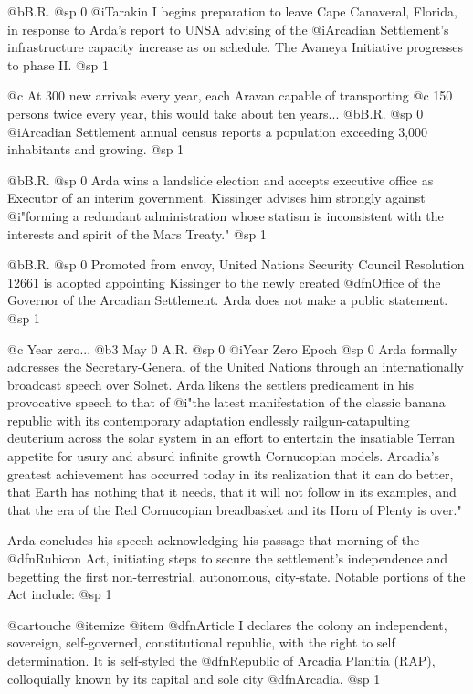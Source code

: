 @b{B.R.}
@sp 0
@i{Tarakin I} begins preparation to leave Cape Canaveral, Florida, in response to Arda's report to UNSA advising of the @i{Arcadian Settlement's} infrastructure capacity increase as on schedule. The Avaneya Initiative progresses to phase II.
@sp 1

@c At 300 new arrivals every year, each Aravan capable of transporting
@c  150 persons twice every year, this would take about ten years...
@b{B.R.}
@sp 0
@i{Arcadian Settlement} annual census reports a population exceeding 3,000 inhabitants and growing.
@sp 1

@b{B.R.}
@sp 0
Arda wins a landslide election and accepts executive office as Executor of an interim government. Kissinger advises him strongly against @i{"forming a redundant administration whose statism is inconsistent with the interests and spirit of the Mars Treaty."}
@sp 1

@b{B.R.}
@sp 0
Promoted from envoy, United Nations Security Council Resolution 12661 is adopted appointing Kissinger to the newly created @dfn{Office of the Governor of the Arcadian Settlement}. Arda does not make a public statement.
@sp 1

@c Year zero...
@b{3 May 0 A.R.}
@sp 0
@i{Year Zero Epoch}
@sp 0
Arda formally addresses the Secretary-General of the United Nations through an internationally broadcast speech over Solnet. Arda likens the settlers predicament in his provocative speech to that of @i{"the latest manifestation of the classic banana republic with its contemporary adaptation endlessly railgun-catapulting deuterium across the solar system in an effort to entertain the insatiable Terran appetite for usury and absurd infinite growth Cornucopian models. Arcadia's greatest achievement has occurred today in its realization that it can do better, that Earth has nothing that it needs, that it will not follow in its examples, and that the era of the Red Cornucopian breadbasket and its Horn of Plenty is over."}

Arda concludes his speech acknowledging his passage that morning of the @dfn{Rubicon Act}, initiating steps to secure the settlement's independence and begetting the first non-terrestrial, autonomous, city-state. Notable portions of the Act include:
@sp 1

@cartouche
@itemize
@item
@dfn{Article I} declares the colony an independent, sovereign, self-governed, constitutional republic, with the right to self determination. It is self-styled the @dfn{Republic of Arcadia Planitia (RAP)}, colloquially known by its capital and sole city @dfn{Arcadia}.
@sp 1

